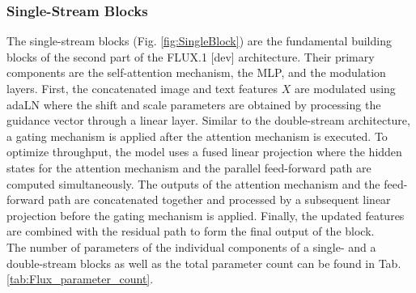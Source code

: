 \subsubsection{Single-Stream Blocks}
The single-stream blocks (Fig. \ref{fig:SingleBlock}) are the fundamental building blocks of the second part of the FLUX.1 {[dev]} architecture. Their primary components are the self-attention mechanism, the \gls{MLP}, and the modulation layers. First, the concatenated image and text features $X$ are modulated using \gls{adaLN} where the shift and scale parameters are obtained by processing the guidance vector through a linear layer. Similar to the double-stream architecture, a gating mechanism is applied after the attention mechanism is executed. To optimize throughput, the model uses a fused linear projection where the hidden states for the attention mechanism and the parallel feed-forward path are computed simultaneously.  The outputs of the attention mechanism and the feed-forward path are concatenated together and processed by a subsequent linear projection before the gating mechanism is applied. Finally, the updated features are combined with the residual path to form the final output of the block. \\


The number of parameters of the individual components of a single- and a double-stream blocks as well as the total parameter count can be found in Tab. \ref{tab:Flux_parameter_count}.


